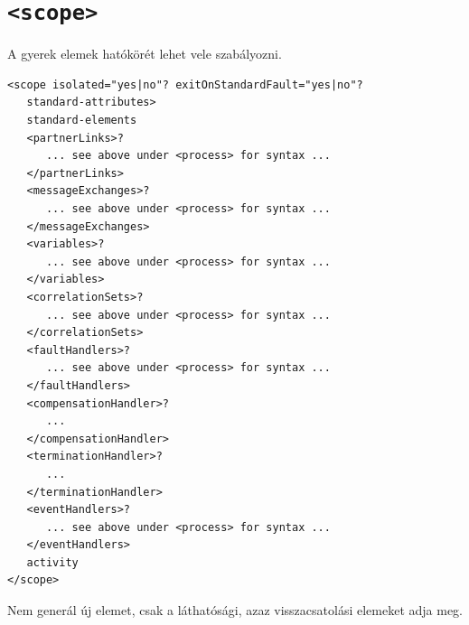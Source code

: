 \section{\texttt{<scope>}}

A gyerek elemek hatókörét lehet vele szabályozni.
\begin{verbatim}
<scope isolated="yes|no"? exitOnStandardFault="yes|no"?
   standard-attributes>
   standard-elements
   <partnerLinks>?
      ... see above under <process> for syntax ...
   </partnerLinks>
   <messageExchanges>?
      ... see above under <process> for syntax ...
   </messageExchanges>
   <variables>?
      ... see above under <process> for syntax ...
   </variables>
   <correlationSets>?
      ... see above under <process> for syntax ...
   </correlationSets>
   <faultHandlers>?
      ... see above under <process> for syntax ...
   </faultHandlers>
   <compensationHandler>?
      ...
   </compensationHandler>
   <terminationHandler>?
      ...
   </terminationHandler>
   <eventHandlers>?
      ... see above under <process> for syntax ...
   </eventHandlers>
   activity
</scope>
\end{verbatim}
Nem generál új elemet, csak a láthatósági, azaz visszacsatolási elemeket adja meg. 


